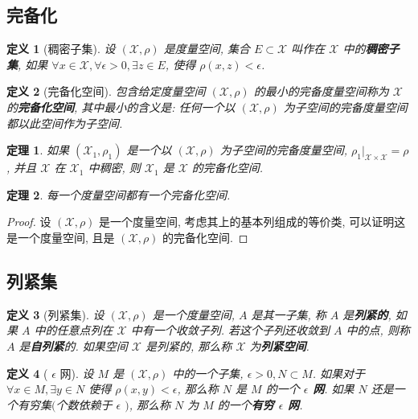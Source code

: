 \documentclass[12pt,a4paper]{article}
\newtheorem{thm}{定理}[subsection]  %
\newtheorem{definition}{定义}[subsection] %
\begin{document}
\subsection{完备化}
\begin{definition}[稠密子集]
    设 $(\mathscr{X},\rho)$ 是度量空间, 集合 $E \subset \mathscr{X}$ 叫作在 $\mathscr{X}$ 中的\textbf{稠密子集}, 如果 $\forall x \in \mathscr{X}, \forall \epsilon > 0, \exists z \in E$, 使得
     $\rho(x,z) < \epsilon$. 
\end{definition}

\begin{definition}[完备化空间]
    包含给定度量空间 $(\mathscr{X},\rho)$ 的最小的完备度量空间称为 $\mathscr{X}$ 的\textbf{完备化空间}, 其中最小的含义是: 任何一个以 $(\mathscr{X},\rho)$ 为子空间的完备度量空间都以此空间作为子空间.
\end{definition}

\begin{thm}
    如果 $(\mathscr{X}_1, \rho_1)$ 是一个以 $(\mathscr{X}, \rho)$ 为子空间的完备度量空间, $\rho_1 | _{\mathscr{X} \times \mathscr{X}} = \rho$, 并且 $\mathscr{X}$ 在 $\mathscr{X}_1$ 中稠密, 则 $\mathscr{X}_1$ 是 $\mathscr{X}$ 的完备化空间.
\end{thm}

\begin{thm}
    每一个度量空间都有一个完备化空间.
\end{thm}
\begin{proof}
    设 $(\mathscr{X}, \rho)$ 是一个度量空间, 考虑其上的基本列组成的等价类, 可以证明这是一个度量空间, 且是 $(\mathscr{X}, \rho)$ 的完备化空间.
\end{proof}

\subsection{列紧集}
\begin{definition}[列紧集]
    设 $(\mathscr{X}, \rho)$ 是一个度量空间, $A$ 是其一子集, 称 $A$ 是\textbf{列紧的}, 如果 $A$ 中的任意点列在 $\mathscr{X}$ 中有一个收敛子列. 
    若这个子列还收敛到 $A$ 中的点, 则称 $A$ 是\textbf{自列紧}的. 如果空间 $\mathscr{X}$ 是列紧的, 那么称 $\mathscr{X}$ 为\textbf{列紧空间}.
\end{definition}

\begin{definition}[ $\epsilon$ 网]
    设 $M$ 是 $(\mathscr{X}, \rho)$ 中的一个子集, $\epsilon > 0, N \subset M$. 如果对于 $\forall x \in M, \exists y \in N$ 使得 $\rho(x,y) < \epsilon$, 那么称 $N$ 是 $M$ 的一个\textbf{ $\epsilon$ 网}. 
    如果 $N$ 还是一个有穷集$($个数依赖于 $\epsilon$ $)$, 那么称 $N$ 为 $M$ 的一个\textbf{有穷 $\epsilon$ 网}.
\end{definition}
\end{document}
